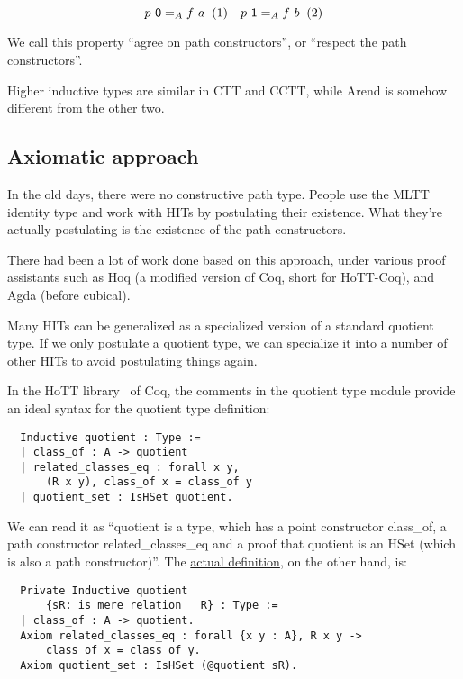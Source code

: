 \[
  p~\textsf 0 =_A f~a
  \xtag
  \quad
  p~\textsf 1 =_A f~b
  \xtag
\]

We call this property ``agree on path constructors'',
or ``respect the path constructors''.

Higher inductive types are similar in CTT and CCTT,
while Arend is somehow different from the other two.

\subsection{Axiomatic approach}
\label{subsec:axiomatic}

In the old days, there were no constructive path type.
People use the MLTT identity type and
work with HITs by postulating their existence.
What they're actually postulating is the existence of the path constructors.

There had been a lot of work done based on this approach,
under various proof assistants such as Hoq
(a modified version of Coq, short for HoTT-Coq),
and Agda (before cubical).

Many HITs can be generalized as a specialized version of a standard
quotient type. If we only postulate a quotient type, we can specialize
it into a number of other HITs to avoid postulating things again.

In the HoTT library~\cite{HottCoq} of Coq, the comments in the quotient
type module provide an ideal syntax for the quotient type definition:

\begin{verbatim}
  Inductive quotient : Type :=
  | class_of : A -> quotient
  | related_classes_eq : forall x y,
      (R x y), class_of x = class_of y
  | quotient_set : IsHSet quotient.
\end{verbatim}

We can read it as ``\textsf{quotient} is a type,
which has a point constructor \textsf{class\_of},
a path constructor \textsf{related\_classes\_eq}
and a proof that \textsf{quotient} is an HSet
(which is also a path constructor)''.
The \href{https://github.com/HoTT/HoTT/blob/b20bb573739284349a968bb219405255c744049d/theories/HIT/quotient.v#L40-L42}
{actual definition}, on the other hand, is:

\begin{verbatim}
  Private Inductive quotient
      {sR: is_mere_relation _ R} : Type :=
  | class_of : A -> quotient.
  Axiom related_classes_eq : forall {x y : A}, R x y ->
      class_of x = class_of y.  
  Axiom quotient_set : IsHSet (@quotient sR).
\end{verbatim}

